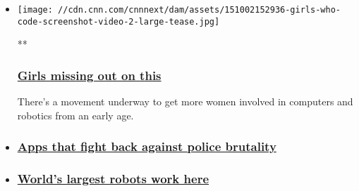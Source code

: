 \begin{itemize}
\item
  \href{/videos/us/2015/10/01/girls-who-code-breaking-ground-orig-ad.cnn}{}

  \texttt{[image: //cdn.cnn.com/cnnnext/dam/assets/151002152936-girls-who-code-screenshot-video-2-large-tease.jpg]}

  **

  \hypertarget{girls-missing-out-on-this}{%
  \subsubsection{\texorpdfstring{\href{/videos/us/2015/10/01/girls-who-code-breaking-ground-orig-ad.cnn}{Girls
  missing out on
  this}}{Girls missing out on this}}\label{girls-missing-out-on-this}}

  There's a movement underway to get more women involved in computers
  and robotics from an early age.
\item
  \hypertarget{apps-that-fight-back-against-police-brutality}{%
  \subsubsection{\texorpdfstring{\href{/videos/us/2015/10/01/civil-rights-app-breaking-ground-orig-jl.cnn}{Apps
  that fight back against police
  brutality}}{Apps that fight back against police brutality}}\label{apps-that-fight-back-against-police-brutality}}
\item
  \hypertarget{worlds-largest-robots-work-here}{%
  \subsubsection{\texorpdfstring{\href{/videos/us/2015/10/01/factory-of-future-breaking-ground-orig-ad.cnn}{World's
  largest robots work
  here}}{World's largest robots work here}}\label{worlds-largest-robots-work-here}}
\end{itemize}

